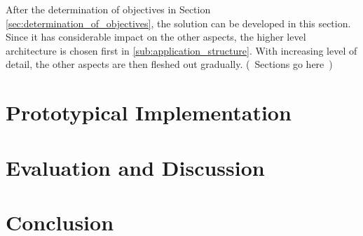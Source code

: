 \documentclass[language=english,noinputenc]{wiwwuwordrprt}
\begin{document}
      After the determination of objectives in Section \ref{sec:determination_of_objectives}, the solution can be developed in this section. Since it has considerable impact on the other aspects, the higher level architecture is chosen first in \ref{sub:application_structure}. With increasing level of detail, the other aspects are then fleshed out gradually. (~Sections go here~)

      


  \chapter{Prototypical Implementation} %
    \label{cha:implementation}

    

  \chapter{Evaluation and Discussion} %
    \label{cha:evaluation}
    

  \chapter{Conclusion} %
    \label{cha:conclusion}
    

  
  
\end{document}
